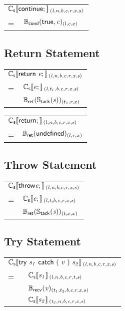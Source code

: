 \documentclass[a4j]{jsarticle}
\newcommand{\lb}{[\![}				%
\newcommand{\rb}{]\!]}				%
\newcommand{\db}[1]{\lb#1\rb}			%
\newcommand{\den}[2]{{#1}\db{#2}\,}
\newcommand{\defC}[3]{\den{#1}{\sf #2}_{\it #3}}
\newcommand{\Cs}{\defC{\mathbb{C}_{\sf s}}}
\newcommand{\Stack}[1]{\mathbb{S}_{\sf tack}(#1)}
\newcommand{\defB}[3]{{#1}({\sf #2})_{#3}}
\newcommand{\Bcond}{\defB{\mathbb{B}_{\sf cond}}}
\newcommand{\Brecv}{\defB{\mathbb{B}_{\sf recv}}}
\newcommand{\Bret}{\defB{\mathbb{B}_{\sf ret}}}
\newcommand{\var}[1]{{\it #1}}
\begin{document}
\begin{tabular}{ll}
\multicolumn{2}{l}{
	$ \Cs{ continue; }{(l, n, b, c, r, x, s)} $
}  \\
=  &  $ \Bcond{ true, \var{c} }{(l, c, x)}    $
\end{tabular}



\subsection{Return Statement}

\begin{tabular}{ll}
\multicolumn{2}{l}{
	$ \Cs{ return\ \var{e}; }{(l, n, b, c, r, x, s)} $
}  \\
=  &  $ \Cs{ \var{e}; }{(l, t_1, b, c, r, x, s)} $ \\
   &  $ \Bret{ \Stack{\var{s}} }{(t_1, r, x)}    $
\end{tabular}

\vspace{1em}

\begin{tabular}{ll}
\multicolumn{2}{l}{
	$ \Cs{ return; }{(l, n, b, c, r, x, s)} $
}  \\
=  &  $ \Bret{ undefined }{(l, r, x)}    $
\end{tabular}



\subsection{Throw Statement}

\begin{tabular}{ll}
\multicolumn{2}{l}{
	$ \Cs{ throw \var{e}; }{(l, n, b, c, r, x, s)} $
}  \\
=  &  $ \Cs{ \var{e}; }{(l, t, b, c, r, x, s)} $ \\
   &  $ \Bret{ \Stack{\var{s}} }{(t, x, x)}    $
\end{tabular}



\subsection{Try Statement}

\begin{tabular}{ll}
\multicolumn{2}{l}{
	$ \Cs{ try\ \var{s_1}\ catch\ (\ \var{v}\ )\ \var{s_2} }{(l, n, b, c, r, x, s)} $
}  \\
=  &  $ \Cs{ \var{s_1} }{(l, n, b, c, r, t, s)} $ \\
   &  $ \Brecv{ \var{v} }{(t_1, t_2, b, c, r, x, s)} $ \\
   &  $ \Cs{ \var{s_2} }{(t_2, n, b, c, r, x, s)} $
\end{tabular}
\end{document}
